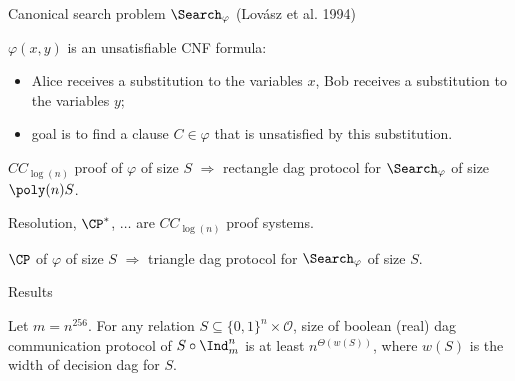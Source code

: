 \begin{frame}{Canonical search problem $\Search_{\varphi}$ (Lov{\'{a}}sz et al. 1994)}
    
    $\varphi(x, y)$ is an unsatisfiable CNF formula:
    \begin{itemize}
        \item Alice receives a substitution to the variables $x$, Bob receives a substitution to the
            variables $y$;
        \item goal is to find a clause $C \in \varphi$ that is unsatisfied by this substitution.
    \end{itemize}

    \pause

    \begin{theorem}[Kraj{\'{\i}}{\v{c}}ek 95; S 17]
        $CC_{\log(n)}$ proof of $\varphi$ of size $S$ $\Rightarrow$ rectangle dag protocol for
        $\Search_{\varphi}$ of size $\poly(n) S$.
    \end{theorem}

    Resolution, $\CP^*$, $\dots$ are $CC_{\log(n)}$ proof systems.

    \pause
    
    \begin{theorem}[S 17]
        $\CP$ of $\varphi$ of size $S$ $\Rightarrow$ triangle dag protocol for $\Search_{\varphi}$ of
        size $S$.
    \end{theorem}
\end{frame}




\begin{frame}{Results}
    \begin{theorem}
        Let $m = n^{256}$. For any relation $S \subseteq \{0,1\}^n \times \mathcal{O}$, size of boolean
        (real) dag communication protocol of $S \circ \Ind_m^n$ is at least $n^{\Theta(w(S))}$, where
        $w(S)$ is the width of decision dag for $S$.
    \end{theorem}
\end{frame}
